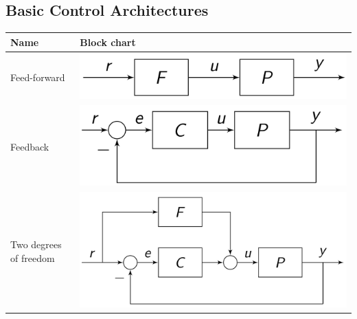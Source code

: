 \subsection{Basic Control Architectures}
    \begin{tabu}{X[m] X[2, c, m]}
        \textbf{Name}               & \textbf{Block chart}\\
        \hline \hline
        Feed-forward      & \includegraphics[width = \linewidth]{src/images/architecture_feed_forward.png}\\
        \hline
        Feedback    & \includegraphics[width = \linewidth]{src/images/architecture_feedback.png}\\
        \hline
        Two degrees of freedom    & \includegraphics[width = \linewidth]{src/images/architecture_two_freedom.png}
    \end{tabu}